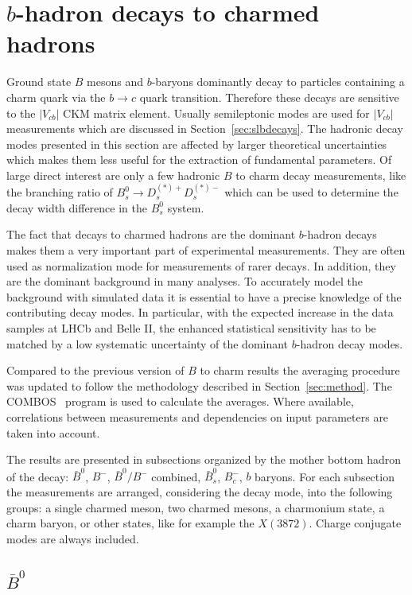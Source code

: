 \section{$b$-hadron decays to charmed hadrons}
\label{sec:b2c}
Ground state $B$ mesons and $b$-baryons dominantly decay to particles containing a charm quark via the $b \rightarrow c$ quark transition.
Therefore these decays are sensitive to the $|V_{cb}|$ CKM matrix element.
Usually semileptonic modes are used for $|V_{cb}|$ measurements which are discussed in Section~\ref{sec:slbdecays}.
The hadronic decay modes presented in this section are affected by larger theoretical uncertainties which makes them less useful for the extraction of fundamental parameters.
Of large direct interest are only a few hadronic $B$ to charm decay measurements, like the branching ratio of $B_s^0 \rightarrow D_s^{(*)+} D_s^{(*)-}$ which can be used to determine the decay width difference in the $B_s^0$ system.

The fact that decays to charmed hadrons are the dominant $b$-hadron decays makes them a very important part of experimental measurements.
They are often used as normalization mode for measurements of rarer decays.
In addition, they are the dominant background in many analyses.
To accurately model the background with simulated data it is essential to have a precise knowledge of the contributing decay modes.
In particular, with the expected increase in the data samples at LHCb and Belle II, the enhanced statistical sensitivity has to be matched by a low systematic uncertainty of the dominant $b$-hadron decay modes.

Compared to the previous version of $B$ to charm results the averaging procedure was updated to follow the methodology described in Section~\ref{sec:method}.
The COMBOS~\cite{Combos:1999} program is used to calculate the averages.
Where available, correlations between measurements and dependencies on input parameters are taken into account.

The results are presented in subsections organized by the mother bottom hadron of the decay: $\bar{B}^0$, $B^-$, $\bar{B}^0/B^-$ combined, $\bar{B}_s^0$, $B_c^-$, $b$ baryons.
For each subsection the measurements are arranged, considering the decay mode, into the following groups: a single charmed meson, two charmed mesons, a charmonium state, a charm baryon, or other states, like for example the $X(3872)$.
Charge conjugate modes are always included.

\subsection{$\bar{B}^0$}

